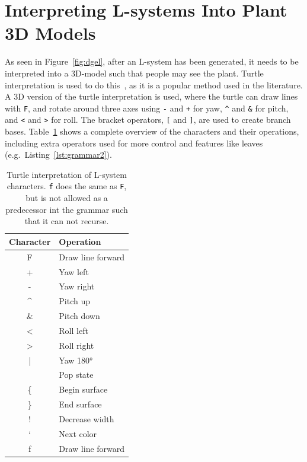 \section{Interpreting L-systems Into Plant 3D Models}
\label{sec:interpreting}
As seen in Figure~\ref{fig:dgel}, after an \gls{L-system} has been generated, it needs to be interpreted into a 3D-model such that people may see the plant.
Turtle interpretation is used to do this~\cite{2012Prusinkiewicz}, as it is a popular method used in the literature.
A 3D version of the turtle interpretation is used, where the turtle can draw lines with \texttt{F}, and rotate around three axes using \texttt{-} and \texttt{+} for yaw, \texttt{\textasciicircum} and \texttt{\&} for pitch, and \texttt{<} and \texttt{>} for roll.
The bracket operators, \texttt{[} and \texttt{]}, are used to create branch bases.
Table~\ref{tab:turtle-cmd} shows a complete overview of the characters and their operations, including extra operators used for more control and features like leaves (e.g.\ Listing~\ref{lst:grammar2}).

\begin{table}
    \centering
    \begin{tabular}{| c | l |}
    \hline
    \textbf{Character} & \textbf{Operation} \\ \hline
    F & Draw line forward \\ \hline
    + & Yaw left \\ \hline
    - & Yaw right \\ \hline
    \textasciicircum & Pitch up \\ \hline
    \& & Pitch down \\ \hline
    < & Roll left \\ \hline
    > & Roll right \\ \hline
    | & Yaw 180° \\ \hline
    [ & Push state \\ \hline
    ] & Pop state \\ \hline
    \{ & Begin surface \\ \hline
    \} & End surface \\ \hline
    ! & Decrease width \\ \hline
    ` & Next color \\ \hline
    f & Draw line forward \\
    \hline
    \end{tabular}
    \caption[Turtle interpretation of L-system characters]{Turtle interpretation of \gls{L-system} characters. \texttt{f} does the same as \texttt{F}, but is not allowed as a predecessor int the grammar such that it can not recurse.}
    \label{tab:turtle-cmd}
\end{table}

